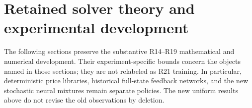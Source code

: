 \section{Retained solver theory and experimental development}
The following sections preserve the substantive R14--R19 mathematical and numerical development. Their experiment-specific bounds concern the objects named in those sections; they are not relabeled as R21 training. In particular, deterministic price libraries, historical full-state feedback networks, and the new stochastic neural mixtures remain separate policies. The new uniform results above do not revise the old observations by deletion.

















\endgroup

